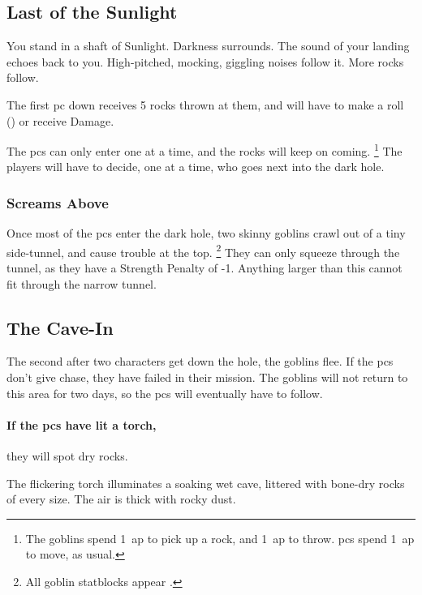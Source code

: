 \begin{multicols}{2}

\subsection{Last of the Sunlight}

\begin{boxtext}
  You stand in a shaft of Sunlight.
  Darkness surrounds.
  The sound of your landing echoes back to you.
  High-pitched, mocking, giggling noises follow it.
  More rocks follow.
\end{boxtext}

The first \gls{pc} down receives 5 rocks thrown at them, and will have to make a  roll (\tn[10]) or receive  Damage.

The \glspl{pc} can only enter one at a time, and the rocks will keep on coming.%
\footnote{The goblins spend 1~\gls{ap} to pick up a rock, and 1~\gls{ap} to throw.
\Glspl{pc} spend 1~\gls{ap} to move, as usual.}
The players will have to decide, one at a time, who goes next into the dark hole.

\subsubsection{Screams Above}

Once most of the \glspl{pc} enter the dark hole, two skinny goblins crawl out of a tiny side-tunnel, and cause trouble at the top.%
\footnote{All goblin statblocks appear .}
They can only squeeze through the tunnel, as they have a Strength Penalty of -1.
Anything larger than this cannot fit through the narrow tunnel.

\subsection{The Cave-In}

The second after two characters get down the hole, the goblins flee.
If the \glspl{pc} don't give chase, they have failed in their mission.
The goblins will not return to this area for two days, so the \glspl{pc} will eventually have to follow.

\paragraph{If the \glspl{pc} have lit a torch,}
they will spot dry rocks.

\begin{boxtext}
  The flickering torch illuminates a soaking wet cave, littered with bone-dry rocks of every size.
  The air is thick with rocky dust.
\end{boxtext}


\end{multicols}
